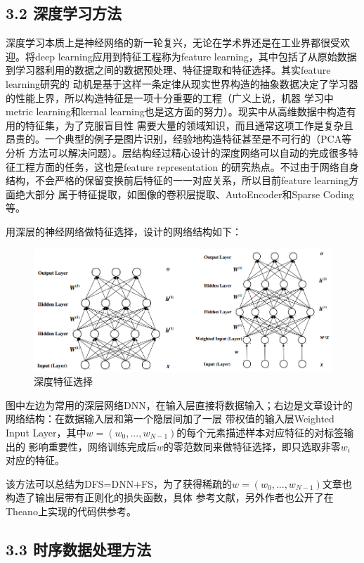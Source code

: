\documentclass[a4paper,UTF8]{article}
\begin{document}
\subsection*{3.2 深度学习方法}
深度学习本质上是神经网络的新一轮复兴，无论在学术界还是在工业界都很受欢迎。将deep learning应用到特征工程称为feature
learning，其中包括了从原始数据到学习器利用的数据之间的数据预处理、特征提取和特征选择。其实feature learning研究的
动机是基于这样一条定律从现实世界构造的抽象数据决定了学习器的性能上界，所以构造特征是一项十分重要的工程（广义上说，机器
学习中metric learning和kernal learning也是这方面的努力）。现实中从高维数据中构造有用的特征集，为了克服盲目性
需要大量的领域知识，而且通常这项工作是复杂且昂贵的。一个典型的例子是图片识别，经验地构造特征甚至是不可行的（PCA等分析
方法可以解决问题）。层结构经过精心设计的深度网络可以自动的完成很多特征工程方面的任务，这也是feature representation
的研究热点。不过由于网络自身结构，不会严格的保留变换前后特征的一一对应关系，所以目前feature learning方面绝大部分
属于特征提取，如图像的卷积层提取、AutoEncoder和Sparse Coding等。

\cite{DBLP:conf/recomb/LiCW15}用深层的神经网络做特征选择，设计的网络结构如下：

\begin{figure}[!htbp]
  \centering
  \includegraphics[scale=0.4]{DFS.png}
  \caption{深度特征选择}
\end{figure}
图中左边为常用的深层网络DNN，在输入层直接将数据输入；右边是文章设计的网络结构：在数据输入层和第一个隐层间加了一层
带权值的输入层Weighted Input Layer，其中$w=(w_{0},...,w_{N-1})$的每个元素描述样本对应特征的对标签输出的
影响重要性，网络训练完成后$w$的零范数同来做特征选择，即只选取非零$w_{i}$对应的特征。

该方法可以总结为DFS=DNN+FS，为了获得稀疏的$w=(w_{0},...,w_{N-1})$文章也构造了输出层带有正则化的损失函数，具体
参考文献，另外作者也公开了在Theano上实现的代码供参考\cite{Theano/DFS/package}。


\subsection*{3.3 时序数据处理方法}
\end{document}
